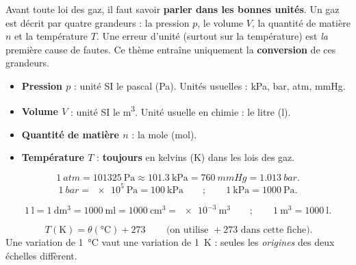 \documentclass[11pt,a4paper]{article}
\begin{document}

Avant toute loi des gaz, il faut savoir \textbf{parler dans les bonnes unités}. Un gaz est décrit par
quatre grandeurs : la pression $p$, le volume $V$, la quantité de matière $n$ et la température $T$.
Une erreur d'unité (surtout sur la température) est \emph{la} première cause de fautes. Ce thème
entraîne uniquement la \textbf{conversion} de ces grandeurs.

\begin{cle}
\begin{itemize}[leftmargin=1.4em,topsep=2pt,itemsep=1.5pt]
  \item \textbf{Pression $p$} : unité SI le pascal (\si{\pascal}). Unités usuelles : \si{\kilo\pascal},
        \si{bar}, \si{atm}, \si{mmHg}.
  \item \textbf{Volume $V$} : unité SI le \si{\meter\cubed}. Unité usuelle en chimie : le litre
        (\si{\litre}).
  \item \textbf{Quantité de matière $n$} : la mole (\si{\mole}).
  \item \textbf{Température $T$} : \textbf{toujours} en kelvins (\si{\kelvin}) dans les lois des gaz.
\end{itemize}
\end{cle}

\begin{cle}
\[ \qty{1}{atm}=\qty{101325}{\pascal}\approx\qty{101.3}{\kilo\pascal}
   =\qty{760}{mmHg}=\qty{1.013}{bar}. \]
\[ \qty{1}{bar}=\qty{e5}{\pascal}=\qty{100}{\kilo\pascal}
   \qquad;\qquad \qty{1}{\kilo\pascal}=\qty{1000}{\pascal}. \]
\end{cle}

\begin{cle}
\[ \qty{1}{\litre}=\qty{1}{\deci\meter\cubed}=\qty{1000}{\milli\litre}=\qty{1000}{\centi\meter\cubed}
   =\qty{e-3}{\meter\cubed} \qquad;\qquad \qty{1}{\meter\cubed}=\qty{1000}{\litre}. \]
\end{cle}

\begin{cle}
\[ \boxed{\,T(\si{\kelvin})=\theta(\si{\degreeCelsius})+273\,}\qquad\text{(on utilise }+273\text{ dans cette fiche).} \]
Une variation de \qty{1}{\degreeCelsius} vaut une variation de \qty{1}{\kelvin} : seules les
\emph{origines} des deux échelles diffèrent.
\end{cle}
\end{document}
